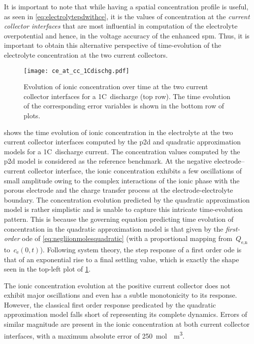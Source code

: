 It  is important  to  note that  while having  a  spatial concentration  profile
is  useful,  as  seen  in \cref{eq:electrolytepdwithce}, it  is  the  values  of
concentration  at   the  \emph{current  collector  interfaces}   that  are  most
influential in  computation of the  electrolyte overpotential and hence,  in the
voltage accuracy of the enhanced \gls{spm}. Thus, it is important to obtain this
alternative perspective  of time-evolution  of the electrolyte  concentration at
the two current collectors.

\begin{figure}[!htbp]
    \centering
    \texttt{[image: ce\_at\_cc\_1Cdischg.pdf]}
    \caption[Ionic concentrations at current collector
    interfaces over time for 1C~discharge]{Evolution of ionic concentration over
        time at the two current collector interfaces for a 1C~discharge (top
        row). The time evolution of the corresponding error variables is 
    shown in the bottom row of plots.}
    \label{fig:temporalcequadratic}
\end{figure}

 shows  the time evolution of  ionic concentration
in  the electrolyte  at the  two current  collector interfaces  computed by  the
\gls{p2d} and  quadratic approximation  models for a  1C~discharge  current. The
concentration  values computed  by  the  \gls{p2d} model  is  considered as  the
reference benchmark. At the negative electrode--current collector interface, the
ionic  concentration  exhibits  a  few oscillations  of  small  amplitude  owing
to  the complex  interactions  of  the ionic  phase  with  the porous  electrode
and  the charge  transfer process  at the  electrode-electrolyte boundary.  The
concentration  evolution  predicted  by  the quadratic  approximation  model  is
rather  simplistic  and  is  unable to  capture  this  intricate  time-evolution
pattern.  This  is because  the  governing  equation predicting  time  evolution
of  concentration  in  the  quadratic  approximation  model  is  that  given  by
the  \emph{first-order}  \gls{ode} of \cref{eq:negliionmolesquadratic}  (with  a
proportional mapping from~$Q_\text{e,n}$ to~$c_\text{e}(0,t)$). Following system
theory, the step response  of a first order \gls{ode} is  that of an exponential
rise to a final settling value, which  is exactly the shape seen in the top-left
plot of \cref{fig:temporalcequadratic}.

The ionic  concentration evolution  at the positive  current collector  does not
exhibit major oscillations  and even has a subtle monotonicity  to its response.
However,  the  classical  first  order  response  predicated  by  the  quadratic
approximation model falls short of representing its complete dynamics. Errors of
similar  magnitude  are present  in  the  ionic  concentration at  both  current
collector  interfaces, with  a maximum  absolute error  of \approx\SI{250}{\mole
\per \meter  \cubed}.

